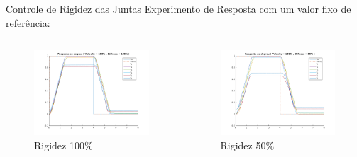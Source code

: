 \documentclass{beamer}
\begin{document}
\begin{frame}{Controle de Rigidez das Juntas}
Experimento de Resposta com um valor fixo de referência:
\begin{columns}
\begin{column}{0.5\textwidth}
   \begin{figure}
    \centering
    \includegraphics[width = \linewidth]{tex/figs/jointIdentification_exp1v100v100.png}
    \caption{Rigidez 100\%}
    \label{fig:mekademo}
\end{figure}
\end{column}
\begin{column}{0.5\textwidth}  %
    \begin{figure}
    \centering
    \includegraphics[width = \linewidth]{tex/figs/jointIdentification_exp2v100v50.png}
    \caption{Rigidez 50\%}
    \label{fig:mekademo}
\end{figure}
\end{column}
\end{columns}
\end{frame}
\end{document}
